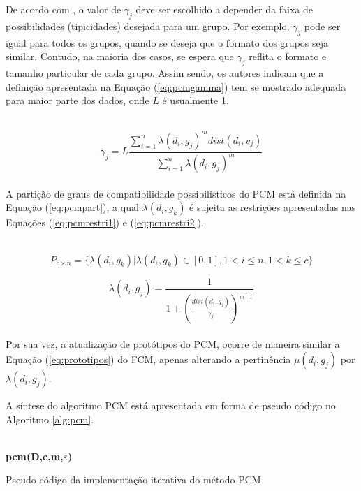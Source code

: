De acordo com , o valor de $\gamma_j$ deve ser escolhido a depender da
faixa de possibilidades (tipicidades) desejada para um grupo. Por exemplo, $\gamma_j$ pode ser igual
para todos os grupos, quando se deseja que o formato dos grupos seja similar.  Contudo, na maioria
dos casos, se espera que $\gamma_j$ reflita o formato e tamanho particular de cada grupo. Assim
sendo, os autores indicam que a definição apresentada na Equação (\ref{eq:pcmgamma}) tem se mostrado
adequada para maior parte dos dados, onde $L$ é usualmente 1. 

\leavevmode\\
\begin{equation}
  \gamma_j = L \frac{\sum_{i=1}^n \lambda(d_i,g_j)^m dist(d_i,v_j)}{\sum_{i=1}^n \lambda(d_i,g_j)^m}
  \label{eq:pcmgamma}
\end{equation}
\leavevmode\\

A partição de graus de compatibilidade possibilísticos do PCM está definida na Equação
(\ref{eq:pcmpart}), a qual $\lambda(d_i, g_k)$ é sujeita as restrições apresentadas nas Equações
(\ref{eq:pcmrestri1}) e (\ref{eq:pcmrestri2}). 

\leavevmode\\
\begin{equation} 
  P_{c \times n} = \{\lambda(d_i, g_k) |\lambda(d_i, g_k) \in [0,1], 1 < i \leq n, 1 < k \leq c\}
  \label{eq:pcmpart} 
\end{equation} 

\begin{equation}
  \lambda(d_i,g_j) = \frac{1}{1+\left(\frac{dist(d_i,g_j)}{\gamma_j}\right)^{\frac{1}{m-1}}}
  \label{eq:lambda}
\end{equation}
\leavevmode\\

Por sua vez, a atualização de protótipos do PCM, ocorre de maneira similar a Equação
(\ref{eq:prototipos}) do FCM, apenas alterando a pertinência $\mu(d_i,g_j)$ por $\lambda(d_i,g_j)$.

A síntese do algoritmo PCM está apresentada em forma de pseudo código no Algoritmo \ref{alg:pcm}. \\

\leavevmode\\
\begin{algorithm}[H] 
  \SetAlgoLined 
  \textbf{{\color{blue}pcm}(D,c,m,$\varepsilon$)}\\
  \caption{Pseudo código da implementação iterativa do método PCM}
  \label{alg:pcm} 
\end{algorithm}
\leavevmode\\

